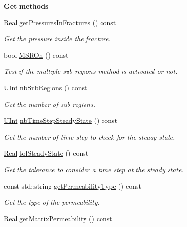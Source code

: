 \begin{Indent}{\bf Get methods}
\begin{DoxyCompactItemize}
\hyperlink{namespaceFVCode3D_a40c1f5588a248569d80aa5f867080e83}{Real} \hyperlink{classFVCode3D_1_1Data_af0b0d3361ceac8257e7342f2b2f6996b}{get\+Pressures\+In\+Fractures} () const 
\begin{DoxyCompactList}\small\item\em Get the pressure inside the fracture. \end{DoxyCompactList}\item 
bool \hyperlink{classFVCode3D_1_1Data_aa0fa184cedbc5779359fdfa59f4c9757}{M\+S\+R\+On} () const 
\begin{DoxyCompactList}\small\item\em Test if the multiple sub-\/regions method is activated or not. \end{DoxyCompactList}\item 
\hyperlink{namespaceFVCode3D_a4bf7e328c75d0fd504050d040ebe9eda}{U\+Int} \hyperlink{classFVCode3D_1_1Data_a7303f11650f8096d87fa70e43d529ccc}{nb\+Sub\+Regions} () const 
\begin{DoxyCompactList}\small\item\em Get the number of sub-\/regions. \end{DoxyCompactList}\item 
\hyperlink{namespaceFVCode3D_a4bf7e328c75d0fd504050d040ebe9eda}{U\+Int} \hyperlink{classFVCode3D_1_1Data_abecf75fa7beb77100d6817ca40acb87f}{nb\+Time\+Step\+Steady\+State} () const 
\begin{DoxyCompactList}\small\item\em Get the number of time step to check for the steady state. \end{DoxyCompactList}\item 
\hyperlink{namespaceFVCode3D_a40c1f5588a248569d80aa5f867080e83}{Real} \hyperlink{classFVCode3D_1_1Data_a4b8976c57267fbea1cdbc2461996610f}{tol\+Steady\+State} () const 
\begin{DoxyCompactList}\small\item\em Get the tolerance to consider a time step at the steady state. \end{DoxyCompactList}\item 
const std\+::string \hyperlink{classFVCode3D_1_1Data_a8407b7350ccbb4deb24ace9affa47497}{get\+Permeability\+Type} () const 
\begin{DoxyCompactList}\small\item\em Get the type of the permeability. \end{DoxyCompactList}\item 
\hyperlink{namespaceFVCode3D_a40c1f5588a248569d80aa5f867080e83}{Real} \hyperlink{classFVCode3D_1_1Data_aa0dcd9ab98c62ff03f4f757360a6e45c}{get\+Matrix\+Permeability} () const 

\end{DoxyCompactItemize}
\end{Indent}
